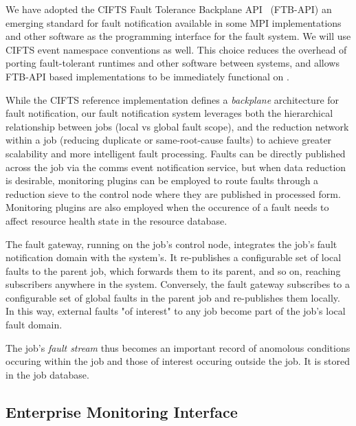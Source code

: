We have adopted the 
CIFTS Fault Tolerance Backplane API~\cite{FTBAPI} (FTB-API)
an emerging standard for fault notification available in some MPI
implementations and other software as the programming interface for the
fault system.  We will use CIFTS event namespace conventions as well.
This choice reduces the overhead of porting fault-tolerant runtimes and
other software between systems, and allows FTB-API based implementations
to be immediately functional on \ngrm.

While the CIFTS reference implementation defines a {\em backplane}
architecture for fault notification, our fault notification system
leverages both the hierarchical relationship between jobs (local vs global
fault scope), and the reduction network within a job (reducing duplicate
or same-root-cause faults) to achieve greater scalability and more intelligent
fault processing.
Faults can be directly published across the job via the comms event
notification service, but when data reduction is desirable, monitoring 
plugins can be employed to route faults through a reduction sieve to
the control node where they are published in processed form.
Monitoring plugins are also employed when the occurence of a fault needs
to affect resource health state in the resource database.

The fault gateway, running on the job's control node, 
integrates the job's fault notification domain with the system's.
It re-publishes a configurable set of local faults to the parent job, 
which forwards them to its parent, and so on, reaching subscribers anywhere
in the system.
Conversely, the fault gateway subscribes to a configurable set of global
faults in the parent job and re-publishes them locally.
In this way, external faults "of interest" to any job become part of the
job's local fault domain.

The job's {\em fault stream} thus becomes an important record of anomolous
conditions occuring within the job and those of interest occuring outside
the job.  It is stored in the job database.

\subsection{Enterprise Monitoring Interface}

